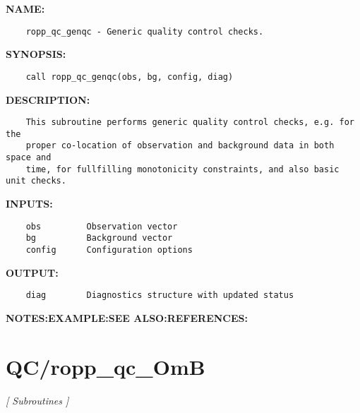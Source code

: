 \label{ch:robo49}
\label{ch:QC_ropp_qc_genqc}
\textbf{NAME:}\hspace{0.08in}\begin{Verbatim}
    ropp_qc_genqc - Generic quality control checks.
\end{Verbatim}
\textbf{SYNOPSIS:}\hspace{0.08in}\begin{Verbatim}
    call ropp_qc_genqc(obs, bg, config, diag)
\end{Verbatim}
\textbf{DESCRIPTION:}\hspace{0.08in}\begin{Verbatim}
    This subroutine performs generic quality control checks, e.g. for the 
    proper co-location of observation and background data in both space and 
    time, for fullfilling monotonicity constraints, and also basic unit checks.
\end{Verbatim}
\textbf{INPUTS:}\hspace{0.08in}\begin{Verbatim}
    obs         Observation vector
    bg          Background vector
    config      Configuration options
\end{Verbatim}
\textbf{OUTPUT:}\hspace{0.08in}\begin{Verbatim}
    diag        Diagnostics structure with updated status
\end{Verbatim}
\textbf{NOTES:}\hspace{0.08in}\textbf{EXAMPLE:}\hspace{0.08in}\textbf{SEE ALSO:}\hspace{0.08in}\textbf{REFERENCES:}\hspace{0.08in}\section{QC/ropp\_qc\_OmB}
\textsl{[ Subroutines ]}

